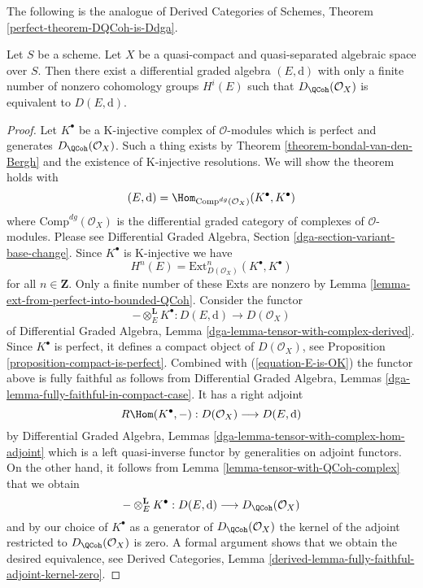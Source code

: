 \noindent
The following is the analogue of
Derived Categories of Schemes, Theorem \ref{perfect-theorem-DQCoh-is-Ddga}.

\begin{theorem}
\label{theorem-DQCoh-is-Ddga}
Let $S$ be a scheme.
Let $X$ be a quasi-compact and quasi-separated algebraic space over $S$.
Then there exist a differential graded algebra $(E, \text{d})$
with only a finite number of nonzero cohomology groups $H^i(E)$
such that $D_\QCoh(\mathcal{O}_X)$ is equivalent
to $D(E, \text{d})$.
\end{theorem}

\begin{proof}
Let $K^\bullet$ be a K-injective complex of $\mathcal{O}$-modules which
is perfect and generates $D_\QCoh(\mathcal{O}_X)$. Such a
thing exists by Theorem \ref{theorem-bondal-van-den-Bergh}
and the existence of K-injective resolutions. We will show the
theorem holds with
$$
(E, \text{d}) = \Hom_{\text{Comp}^{dg}(\mathcal{O}_X)}(K^\bullet, K^\bullet)
$$
where $\text{Comp}^{dg}(\mathcal{O}_X)$ is the differential graded category
of complexes of $\mathcal{O}$-modules. Please see
Differential Graded Algebra, Section \ref{dga-section-variant-base-change}.
Since $K^\bullet$ is K-injective we
have
\begin{equation}
\label{equation-E-is-OK}
H^n(E) = \text{Ext}^n_{D(\mathcal{O}_X)}(K^\bullet, K^\bullet)
\end{equation}
for all $n \in \mathbf{Z}$. Only a finite number of these Exts
are nonzero by Lemma \ref{lemma-ext-from-perfect-into-bounded-QCoh}.
Consider the functor
$$
- \otimes_E^\mathbf{L} K^\bullet :
D(E, \text{d}) \longrightarrow D(\mathcal{O}_X)
$$
of
Differential Graded Algebra, Lemma
\ref{dga-lemma-tensor-with-complex-derived}.
Since $K^\bullet$ is perfect, it defines a compact object of
$D(\mathcal{O}_X)$, see Proposition \ref{proposition-compact-is-perfect}.
Combined with (\ref{equation-E-is-OK}) the functor above is fully
faithful as follows from
Differential Graded Algebra, Lemmas
\ref{dga-lemma-fully-faithful-in-compact-case}. It has a right adjoint
$$
R\Hom(K^\bullet, - ) : D(\mathcal{O}_X) \longrightarrow D(E, \text{d})
$$
by Differential Graded Algebra, Lemmas
\ref{dga-lemma-tensor-with-complex-hom-adjoint}
which is a left quasi-inverse functor by generalities on adjoint
functors. On the other hand, it follows from
Lemma \ref{lemma-tensor-with-QCoh-complex} that we obtain
$$
- \otimes_E^\mathbf{L} K^\bullet :
D(E, \text{d}) \longrightarrow D_\QCoh(\mathcal{O}_X)
$$
and by our choice of $K^\bullet$ as a generator of
$D_\QCoh(\mathcal{O}_X)$ the kernel of the adjoint
restricted to $D_\QCoh(\mathcal{O}_X)$ is zero.
A formal argument shows that we obtain the desired equivalence, see
Derived Categories, Lemma
\ref{derived-lemma-fully-faithful-adjoint-kernel-zero}.
\end{proof}










